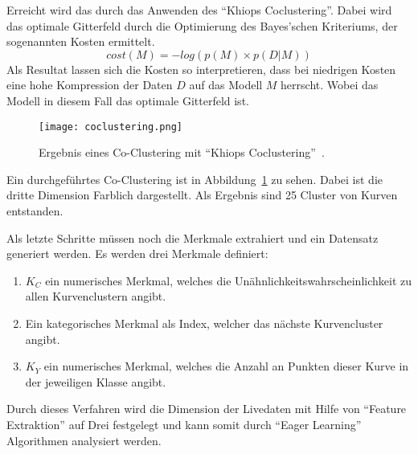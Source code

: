 Erreicht wird das durch das Anwenden des \enquote{Khiops Coclustering}\cite{boulle2012functional}. Dabei wird das optimale Gitterfeld durch die Optimierung des Bayes'schen Kriteriums, der sogenannten Kosten ermittelt. 
\begin{equation}
  cost(M) = -log(p(M) \times p(D|M))
  \label{equ:Bayesian}
\end{equation}
Als Resultat lassen sich die Kosten so interpretieren, dass bei niedrigen Kosten eine hohe Kompression der Daten $D$ auf das Modell $M$ herrscht. Wobei das Modell in diesem Fall das optimale Gitterfeld ist.

\begin{figure}
  \centering
  \texttt{[image: coclustering.png]}
  \caption{Ergebnis eines Co-Clustering mit \enquote{Khiops Coclustering}~\cite{Gay2013}.}
  \label{fig:coclustering}
\end{figure}

Ein durchgeführtes Co-Clustering ist in Abbildung\ \ref{fig:coclustering} zu sehen. Dabei ist die dritte Dimension Farblich dargestellt. Als Ergebnis sind 25 Cluster von Kurven entstanden. 

Als letzte Schritte müssen noch die Merkmale extrahiert und ein Datensatz generiert werden. Es werden drei Merkmale definiert:

\begin{enumerate}
  \item $K_C$ ein numerisches Merkmal, welches die Unähnlichkeitswahrscheinlichkeit zu allen Kurvenclustern angibt.
  \item Ein kategorisches Merkmal als Index, welcher das nächste Kurvencluster angibt.
  \item $K_Y$ ein numerisches Merkmal, welches die Anzahl an Punkten dieser Kurve in der jeweiligen Klasse angibt.
\end{enumerate}

Durch dieses Verfahren wird die Dimension der Livedaten mit Hilfe von \enquote{Feature Extraktion} auf Drei festgelegt und kann somit durch \enquote{Eager Learning} Algorithmen analysiert werden.

